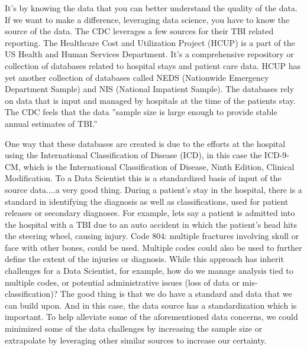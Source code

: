 \documentclass[sigconf]{acmart}
\begin{document}
It's by knowing the data that you can better understand the quality of the data.  If we want to make a difference, leveraging data science, you have to know the source of the data.  The CDC leverages a few sources for their TBI related reporting.  The Healthcare Cost and Utilization Project (HCUP) is a part of the US Health and Human Services Department.  It's a comprehensive repository or collection of databases related to hospital stays and patient care data.  HCUP has yet another collection of databases called NEDS (Nationwide Emergency Department Sample) and NIS (National Impatient Sample).  The databases rely on data that is input and managed by hospitals at the time of the patients stay.  The CDC feels that the data ''sample size is large enough to provide stable annual estimates of TBI.''  

One way that these databases are created is due to the efforts at the hospital using the International Classification of Disease (ICD), in this case the ICD-9-CM, which is the International Classification of Disease, Ninth Edition, Clinical Modification.  To a Data Scientist this is a standardized basis of input of the source data....a very good thing.  During a patient's stay in the hospital, there is a standard in identifying the diagnosis as well as classifications, used for patient releases or secondary diagnoses.  For example, lets say a patient is admitted into the hospital with a TBI due to an auto accident in which the patient's head hits the steering wheel, causing injury. Code 804: multiple fractures involving skull or face with other bones, could be used.  Multiple codes could also be used to further define the extent of the injuries or diagnosis.  While this approach has inherit challenges for a Data Scientist, for example, how do we manage analysis tied to multiple codes, or potential administrative issues (loss of data or mis-classification)? The good thing is that we do have a standard and data that we can build upon.  And in this case, the data source has a standardization which is important. To help alleviate some of the aforementioned data concerns, we could minimized some of the data challenges by increasing the sample size or extrapolate by leveraging other similar sources to increase our certainty.
\end{document}
